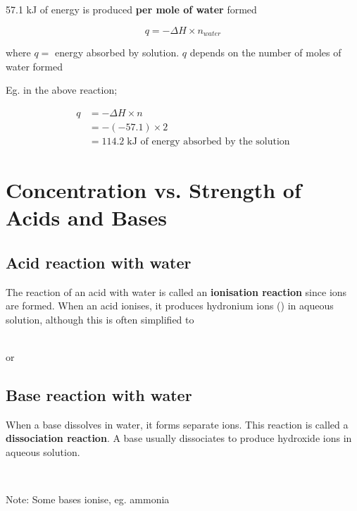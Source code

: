 		57.1 kJ of energy is produced \textbf{per mole of water} formed

		$$q = - \Delta H \times n_{water}$$

		where $q = $ energy absorbed by solution. $q$ depends on the number of moles of water formed

		Eg. in the above reaction;

		\begin{align*}
			q &= - \Delta H \times n \\
			  &= -(-57.1) \times 2 \\
			  &= 114.2 \; \si{\kilo\joule} \text{ of energy absorbed by the solution}
		\end{align*}

\section{Concentration vs. Strength of Acids and Bases} \label{19/02/2025}
	\subsection{Acid reaction with water}
	
		The reaction of an acid with water is called an \textbf{ionisation reaction} since ions are formed. When an acid ionises, it produces hydronium ions () in aqueous solution, although this is often simplified to 
		
		\begin{center}
			 \\
			or \\
		\end{center}

	\subsection{Base reaction with water}
		
		When a base dissolves in water, it forms separate ions. This reaction is called a \textbf{dissociation reaction}. A base usually dissociates to produce hydroxide ions in aqueous solution.

		\begin{center}
			 \\
		\end{center}

		Note: Some bases ionise, eg. ammonia

